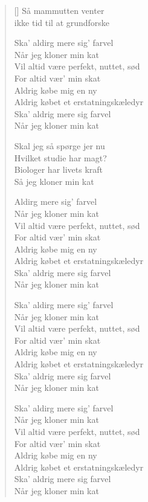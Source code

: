 {\begin{multicols}
\begin{verse}[\versewidth]
Så mammutten venter\\
ikke tid til at grundforske

Ska' aldirg mere sig' farvel\\
Når jeg kloner min kat\\
Vil altid være perfekt, nuttet, sød\\
For altid vær' min skat\\
Aldrig købe mig en ny\\
Aldrig købet et erstatningskæledyr\\
Ska' aldrig mere sig farvel\\
Når jeg kloner min kat

Skal jeg så spørge jer nu\\
Hvilket studie har magt?\\
Biologer har livets kraft\\
Så jeg kloner min kat

Aldirg mere sig' farvel\\
Når jeg kloner min kat\\
Vil altid være perfekt, nuttet, sød\\
For altid vær' min skat\\
Aldrig købe mig en ny\\
Aldrig købet et erstatningskæledyr\\
Ska' aldrig mere sig farvel\\
Når jeg kloner min kat

Ska' aldirg mere sig' farvel\\
Når jeg kloner min kat\\
Vil altid være perfekt, nuttet, sød\\
For altid vær' min skat\\
Aldrig købe mig en ny\\
Aldrig købet et erstatningskæledyr\\
Ska' aldrig mere sig farvel\\
Når jeg kloner min kat

Ska' aldirg mere sig' farvel\\
Når jeg kloner min kat\\
Vil altid være perfekt, nuttet, sød\\
For altid vær' min skat\\
Aldrig købe mig en ny\\
Aldrig købet et erstatningskæledyr\\
Ska' aldrig mere sig farvel\\
Når jeg kloner min kat
\end{verse}
\end{multicols}


}
